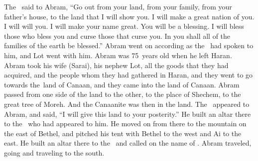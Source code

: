 
\begin{inparaenum}
   The \lord\ said to Abram, ``Go out from your land, from your family, from your father's house, to the land that I will show you.%
   I will make a great nation of you. I will will you. I will make your name great. You will be a blessing.%
   I will bless those who bless you and curse those that curse you. In you shall all of the families of the earth be blessed.''%
   Abram went on according as the \lord\ had spoken to him, and Lot went with him. Abram was 75~years old when he left Haran.%
   Abram took his wife (Sarai), his nephew Lot, all the goods that they had acquired, and the people whom they had gathered in Haran, and they went to go towards the\understood\ land of Canaan, and they came into the land of Canaan.%
   Abram passed from one side of the land to the other, to the place of Shechem, to the great tree of Moreh. And the Canaanite was then in the land.%
   The \lord\ appeared to Abram, and said, ``I will give this land to your posterity.'' He built an altar there to the \lord\ who had appeared to him.%
   He moved on from there to the mountain on the east of Bethel, and pitched his tent with Bethel to the west and Ai to the east. He built an altar there to the \lord\ and called on the name of \god.%
   Abram traveled, going and traveling to the south.%
  

\end{inparaenum}
